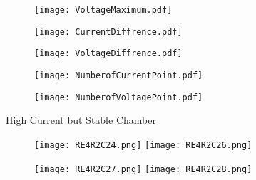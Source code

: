 \documentclass[slidestop,compress,mathserif]{beamer}
\begin{document}
\begin{frame}
\begin{figure}
\centering
\texttt{[image: VoltageMaximum.pdf]}
\end{figure}
\end{frame}

\begin{frame}
\begin{figure}
\centering
\texttt{[image: CurrentDiffrence.pdf]}
\end{figure}
\end{frame}

\begin{frame}
\begin{figure}
\centering
\texttt{[image: VoltageDiffrence.pdf]}
\end{figure}
\end{frame}

\begin{frame}
\begin{figure}
\centering
\texttt{[image: NumberofCurrentPoint.pdf]}
\end{figure}
\end{frame}

\begin{frame}
\begin{figure}
\centering
\texttt{[image: NumberofVoltagePoint.pdf]}
\end{figure}
\end{frame}

\begin{frame} \begin{center} High Current but Stable Chamber \end{center}
\begin{figure}
        \texttt{[image: RE4R2C24.png]}%
        \texttt{[image: RE4R2C26.png]}%
\end{figure}
\end{frame}

\begin{frame}
\begin{figure}        
	\texttt{[image: RE4R2C27.png]}%
	\texttt{[image: RE4R2C28.png]}
\end{figure}
\end{frame}
\end{document}
